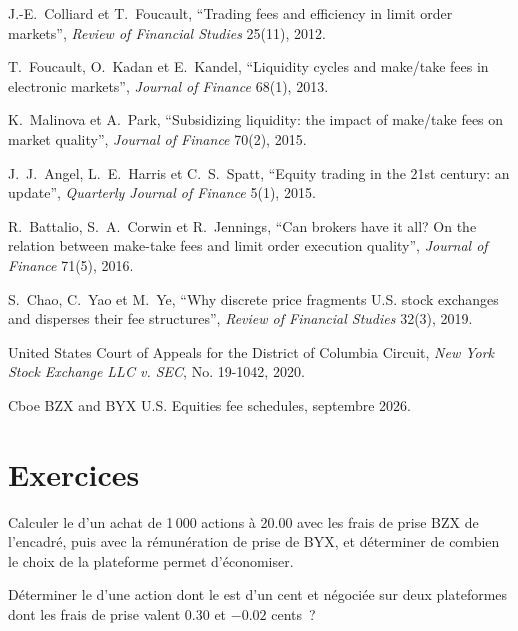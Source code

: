 \begin{omsources}
\item J.-E.~Colliard et T.~Foucault, ``Trading fees and efficiency in limit order markets'', \emph{Review of Financial Studies} 25(11), 2012.
\item T.~Foucault, O.~Kadan et E.~Kandel, ``Liquidity cycles and make/take fees in electronic markets'', \emph{Journal of Finance} 68(1), 2013.
\item K.~Malinova et A.~Park, ``Subsidizing liquidity: the impact of make/take fees on market quality'', \emph{Journal of Finance} 70(2), 2015.
\item J.~J.~Angel, L.~E.~Harris et C.~S.~Spatt, ``Equity trading in the 21st century: an update'', \emph{Quarterly Journal of Finance} 5(1), 2015.
\item R.~Battalio, S.~A.~Corwin et R.~Jennings, ``Can brokers have it all? On the relation between make-take fees and limit order execution quality'',
\emph{Journal of Finance} 71(5), 2016.
\item S.~Chao, C.~Yao et M.~Ye, ``Why discrete price fragments U.S. stock exchanges and disperses their fee structures'', \emph{Review of Financial
Studies} 32(3), 2019.
\item United States Court of Appeals for the District of Columbia Circuit, \emph{New York Stock Exchange LLC v. SEC}, No. 19-1042, 2020.
\item Cboe BZX and BYX U.S. Equities fee schedules, septembre 2026.
\end{omsources}

\section{Exercices}

\begin{exercise}[$\star$]\label{exo:mx:fees-rebates-and-venue-economics:1}
Calculer le  d'un achat de 1\,000 actions à 20.00 avec les frais de prise BZX de l'encadré, puis avec la rémunération de prise de BYX, et déterminer de combien le choix
de la plateforme permet d'économiser.
\end{exercise}

\begin{exercise}[$\star$]\label{exo:mx:fees-rebates-and-venue-economics:2}
Déterminer le  d'une action dont le  est d'un cent et négociée sur deux plateformes dont les frais de prise valent 0.30 et $-0.02$ cents~?
\end{exercise}

